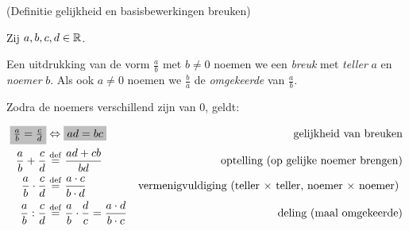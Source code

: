 \documentclass[numbers]{ximera}
\begin{document}
\begin{definition} (Definitie gelijkheid en basisbewerkingen breuken)
	
Zij $a,b,c,d\in \mathbb{R}$. 

Een uitdrukking van de vorm $\frac ab$ met $b\neq0$ noemen we een \textit{breuk} met \textit{teller} $a$ en \textit{noemer} $b$. Als ook $a\neq0$ noemen we $\frac ba$ de \textit{omgekeerde} van $\frac ab$. 

Zodra de noemers verschillend zijn van $0$, geldt:

\begin{align*}
		\important{\frac{a}{b} = \frac{c}{d}}  &\iff \important{ad = bc} 
			& \textrm{gelijkheid van breuken} \\
		\frac{a}{b}+\frac{c}{d} &\perdef \frac{ad+cb}{bd} 
			& \textrm{ optelling (op gelijke noemer brengen)} \\
		\frac{a}{b} \cdot \frac{c}{d} &\perdef \frac{a\cdot c}{b\cdot d} 
			& \textrm{vermenigvuldiging (teller $\times$ teller, noemer $\times$ noemer) }\\%
		\frac{a}{b} : \frac{c}{d} &\perdef \frac ab \cdot \frac dc = \frac{a\cdot d}{b\cdot c} 
		& \textrm{deling (maal omgekeerde)} \\
\end{align*}

\end{definition}
\end{document}
